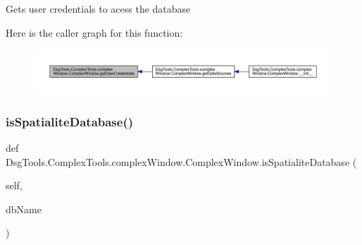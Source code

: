 \begin{DoxyVerb}Gets user credentials to acess the database
\end{DoxyVerb}
 Here is the caller graph for this function\+:
\nopagebreak
\begin{figure}[H]
\begin{center}
\leavevmode
\includegraphics[width=350pt]{class_dsg_tools_1_1_complex_tools_1_1complex_window_1_1_complex_window_a14d77bda16484cd0b5c53c23f44c4a2d_icgraph}
\end{center}
\end{figure}
\mbox{\label{class_dsg_tools_1_1_complex_tools_1_1complex_window_1_1_complex_window_a15c02d111037e49f28f80d537ae76d22}} 
\subsubsection{\texorpdfstring{is\+Spatialite\+Database()}{isSpatialiteDatabase()}}
{\footnotesize\ttfamily def Dsg\+Tools.\+Complex\+Tools.\+complex\+Window.\+Complex\+Window.\+is\+Spatialite\+Database (\begin{DoxyParamCaption}\item[{}]{self,  }\item[{}]{db\+Name }\end{DoxyParamCaption})}

